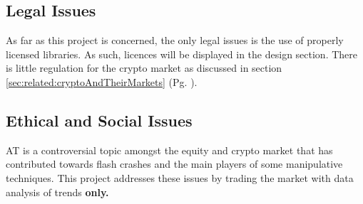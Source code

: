 \subsection{Legal Issues}
\noindent As far as this project is concerned, the only legal issues is the use of properly licensed libraries. As such, licences will be displayed in the design section. There is little regulation for the crypto market as discussed in section \ref{sec:related:cryptoAndTheirMarkets} (Pg. \pageref{sec:related:cryptoAndTheirMarkets}).

\subsection{Ethical and Social Issues}
\noindent AT is a controversial topic amongst the equity and crypto market that has contributed towards flash crashes and the main players of some manipulative techniques. This project addresses these issues by trading the market with data analysis of trends \textbf{only.}  
